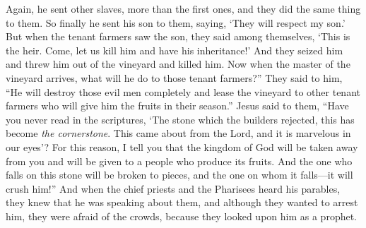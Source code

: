 \begin{biblechapter}
\verse Again, he sent other slaves, more than the first ones, and they did the same thing to them.
\verse So finally he sent his son to them, saying, ‘They will respect my son.’
\verse But when the tenant farmers saw the son, they said among themselves, ‘This is the heir. Come, let us kill him and have his inheritance!’
\verse And they seized him and threw him out of the vineyard and killed him.
\verse Now when the master of the vineyard arrives, what will he do to those tenant farmers?”
\verse They said to him, “He will destroy those evil men completely and lease the vineyard to other tenant farmers who will give him the fruits in their season.”
\verse Jesus said to them, “Have you never read in the scriptures, ‘The stone which the builders rejected, 
this has become \textit{the cornerstone}. 
This came about from the Lord, 
and it is marvelous in our eyes’?
\verse For this reason, I tell you that the kingdom of God will be taken away from you and will be given to a people who produce its fruits.
\verse And the one who falls on this stone will be broken to pieces, and the one on whom it falls—it will crush him!”
\verse And when the chief priests and the Pharisees heard his parables, they knew that he was speaking about them,
\verse and although they wanted to arrest him, they were afraid of the crowds, because they looked upon him as a prophet.
\end{biblechapter}

